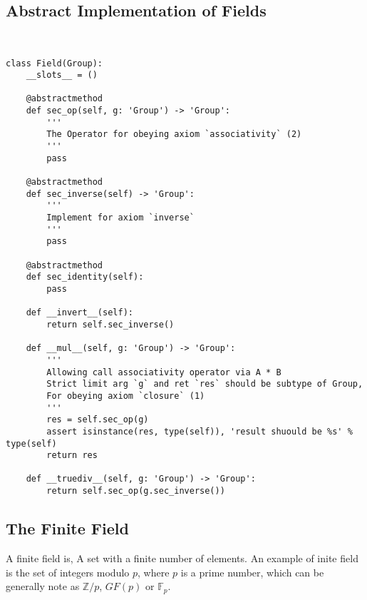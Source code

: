 \documentclass{article}
\begin{document}
\subsection{Abstract Implementation of Fields}
\begin{lstlisting}


class Field(Group):
    __slots__ = ()

    @abstractmethod
    def sec_op(self, g: 'Group') -> 'Group':
        '''
        The Operator for obeying axiom `associativity` (2)
        '''
        pass

    @abstractmethod
    def sec_inverse(self) -> 'Group':
        '''
        Implement for axiom `inverse`
        '''
        pass

    @abstractmethod
    def sec_identity(self):
        pass

    def __invert__(self):
        return self.sec_inverse()

    def __mul__(self, g: 'Group') -> 'Group':
        '''
        Allowing call associativity operator via A * B
        Strict limit arg `g` and ret `res` should be subtype of Group,
        For obeying axiom `closure` (1)
        '''
        res = self.sec_op(g)
        assert isinstance(res, type(self)), 'result shuould be %s' % type(self)
        return res

    def __truediv__(self, g: 'Group') -> 'Group':
        return self.sec_op(g.sec_inverse())
\end{lstlisting}

\subsection{The Finite Field}

A finite field is, A set with a finite number of elements. An example of inite field is the set of integers modulo $p$, where $p$ is a prime number, which can be generally note as $\mathbb{Z}/p$, $GF(p)$ or $\mathbb{F}_p$.
\end{document}
